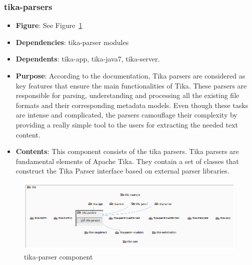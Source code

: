 \documentclass{article}
\begin{document}
\subsubsection{tika-parsers}
\begin {itemize}
\item \textbf{Figure}: See Figure~\ref{fig:tika-parser}
\item \textbf{Dependencies}: tika-parser modules
\item \textbf{Dependents}: tika-app, tika-java7, tika-server.
\item \textbf{Purpose}: According to the documentation, Tika parsers are considered as key features that ensure the main functionalities of Tika. These parsers are responsible for parsing, understanding and processing all the existing file formats and their corresponding metadata models. Even though these tasks are intense and complicated, the parsers camouflage their complexity by providing a really simple tool to the users for extracting the needed text content.
\item \textbf{Contents}: This component consists of the tika parsers. Tika parsers are fundamental elements of Apache Tika. They contain a set of classes that construct the Tika Parser interface based on external parser libraries. 
\end{itemize}
\begin{figure}[ht]
    \centering
    \includegraphics[width=1\textwidth]{report/images/tika-parser.PNG}
    \caption{tika-parser component}
    \label{fig:tika-parser}
\end{figure}
\end{document}

